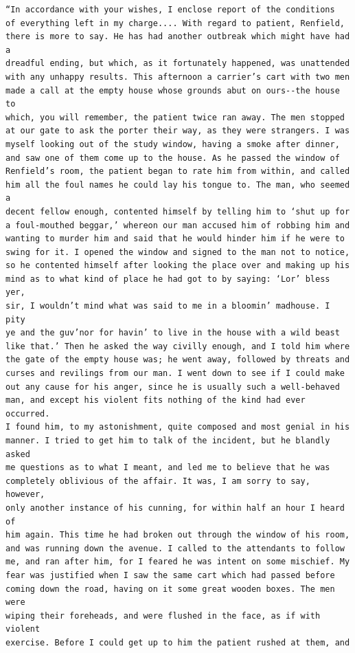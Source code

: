 \documentclass{article}
\begin{document}
\begin{verbatim}
“In accordance with your wishes, I enclose report of the conditions
of everything left in my charge.... With regard to patient, Renfield,
there is more to say. He has had another outbreak which might have had a
dreadful ending, but which, as it fortunately happened, was unattended
with any unhappy results. This afternoon a carrier’s cart with two men
made a call at the empty house whose grounds abut on ours--the house to
which, you will remember, the patient twice ran away. The men stopped
at our gate to ask the porter their way, as they were strangers. I was
myself looking out of the study window, having a smoke after dinner,
and saw one of them come up to the house. As he passed the window of
Renfield’s room, the patient began to rate him from within, and called
him all the foul names he could lay his tongue to. The man, who seemed a
decent fellow enough, contented himself by telling him to ‘shut up for
a foul-mouthed beggar,’ whereon our man accused him of robbing him and
wanting to murder him and said that he would hinder him if he were to
swing for it. I opened the window and signed to the man not to notice,
so he contented himself after looking the place over and making up his
mind as to what kind of place he had got to by saying: ‘Lor’ bless yer,
sir, I wouldn’t mind what was said to me in a bloomin’ madhouse. I pity
ye and the guv’nor for havin’ to live in the house with a wild beast
like that.’ Then he asked the way civilly enough, and I told him where
the gate of the empty house was; he went away, followed by threats and
curses and revilings from our man. I went down to see if I could make
out any cause for his anger, since he is usually such a well-behaved
man, and except his violent fits nothing of the kind had ever occurred.
I found him, to my astonishment, quite composed and most genial in his
manner. I tried to get him to talk of the incident, but he blandly asked
me questions as to what I meant, and led me to believe that he was
completely oblivious of the affair. It was, I am sorry to say, however,
only another instance of his cunning, for within half an hour I heard of
him again. This time he had broken out through the window of his room,
and was running down the avenue. I called to the attendants to follow
me, and ran after him, for I feared he was intent on some mischief. My
fear was justified when I saw the same cart which had passed before
coming down the road, having on it some great wooden boxes. The men were
wiping their foreheads, and were flushed in the face, as if with violent
exercise. Before I could get up to him the patient rushed at them, and

\end{verbatim}
\end{document}
